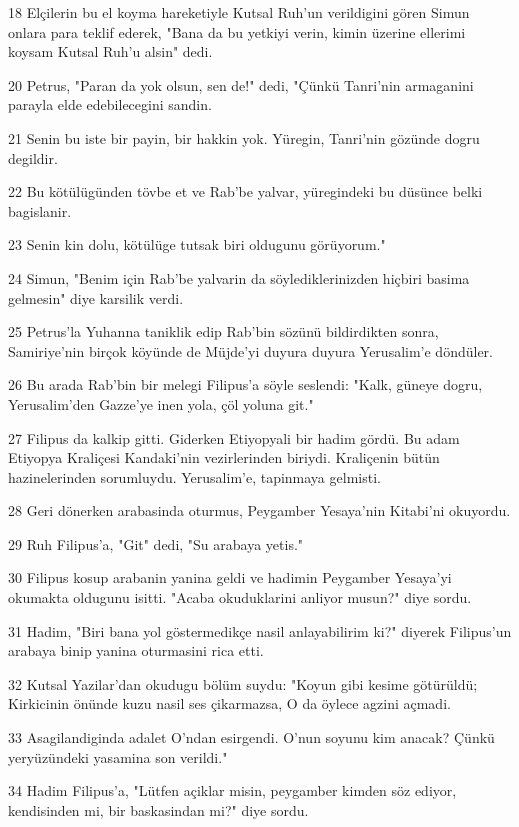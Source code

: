 \par 18 Elçilerin bu el koyma hareketiyle Kutsal Ruh'un verildigini gören Simun onlara para teklif ederek, "Bana da bu yetkiyi verin, kimin üzerine ellerimi koysam Kutsal Ruh'u alsin" dedi.
\par 20 Petrus, "Paran da yok olsun, sen de!" dedi, "Çünkü Tanri'nin armaganini parayla elde edebilecegini sandin.
\par 21 Senin bu iste bir payin, bir hakkin yok. Yüregin, Tanri'nin gözünde dogru degildir.
\par 22 Bu kötülügünden tövbe et ve Rab'be yalvar, yüregindeki bu düsünce belki bagislanir.
\par 23 Senin kin dolu, kötülüge tutsak biri oldugunu görüyorum."
\par 24 Simun, "Benim için Rab'be yalvarin da söylediklerinizden hiçbiri basima gelmesin" diye karsilik verdi.
\par 25 Petrus'la Yuhanna taniklik edip Rab'bin sözünü bildirdikten sonra, Samiriye'nin birçok köyünde de Müjde'yi duyura duyura Yerusalim'e döndüler.
\par 26 Bu arada Rab'bin bir melegi Filipus'a söyle seslendi: "Kalk, güneye dogru, Yerusalim'den Gazze'ye inen yola, çöl yoluna git."
\par 27 Filipus da kalkip gitti. Giderken Etiyopyali bir hadim gördü. Bu adam Etiyopya Kraliçesi Kandaki'nin vezirlerinden biriydi. Kraliçenin bütün hazinelerinden sorumluydu. Yerusalim'e, tapinmaya gelmisti.
\par 28 Geri dönerken arabasinda oturmus, Peygamber Yesaya'nin Kitabi'ni okuyordu.
\par 29 Ruh Filipus'a, "Git" dedi, "Su arabaya yetis."
\par 30 Filipus kosup arabanin yanina geldi ve hadimin Peygamber Yesaya'yi okumakta oldugunu isitti. "Acaba okuduklarini anliyor musun?" diye sordu.
\par 31 Hadim, "Biri bana yol göstermedikçe nasil anlayabilirim ki?" diyerek Filipus'un arabaya binip yanina oturmasini rica etti.
\par 32 Kutsal Yazilar'dan okudugu bölüm suydu: "Koyun gibi kesime götürüldü; Kirkicinin önünde kuzu nasil ses çikarmazsa, O da öylece agzini açmadi.
\par 33 Asagilandiginda adalet O'ndan esirgendi. O'nun soyunu kim anacak? Çünkü yeryüzündeki yasamina son verildi."
\par 34 Hadim Filipus'a, "Lütfen açiklar misin, peygamber kimden söz ediyor, kendisinden mi, bir baskasindan mi?" diye sordu.
